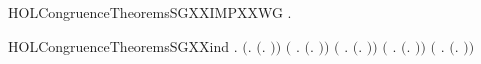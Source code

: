 \newcommand{\HOLCongruenceTheoremsSGXXIMPXXCONTEXT}{\UseVerbatim{HOLCongruenceTheoremsSGXXIMPXXCONTEXT}}
\begin{SaveVerbatim}{HOLCongruenceTheoremsSGXXIMPXXWG}
\HOLTokenTurnstile{} \HOLSymConst{\HOLTokenForall{}}.   \HOLSymConst{\HOLTokenImp{}}  
\end{SaveVerbatim}
\newcommand{\HOLCongruenceTheoremsSGXXIMPXXWG}{\UseVerbatim{HOLCongruenceTheoremsSGXXIMPXXWG}}
\begin{SaveVerbatim}{HOLCongruenceTheoremsSGXXind}
\HOLTokenTurnstile{} \HOLSymConst{\HOLTokenForall{}}.
       \ensuremath{(}\HOLSymConst{\HOLTokenForall{}}.  \ensuremath{(}\HOLTokenLambda{}. \ensuremath{)}\ensuremath{)} \HOLSymConst{\HOLTokenConj{}}
       \ensuremath{(}\HOLSymConst{\HOLTokenForall{}} .   \HOLSymConst{\HOLTokenImp{}}  \ensuremath{(}\HOLTokenLambda{}.  \HOLSymConst{\ensuremath{\ldotp}} \ensuremath{)}\ensuremath{)} \HOLSymConst{\HOLTokenConj{}}
       \ensuremath{(}\HOLSymConst{\HOLTokenForall{}} .   \HOLSymConst{\HOLTokenImp{}}  \ensuremath{(}\HOLTokenLambda{}. \HOLSymConst{\ensuremath{\ldotp}} \ensuremath{)}\ensuremath{)} \HOLSymConst{\HOLTokenConj{}}
       \ensuremath{(}\HOLSymConst{\HOLTokenForall{}} .   \HOLSymConst{\HOLTokenConj{}}   \HOLSymConst{\HOLTokenImp{}}  \ensuremath{(}\HOLTokenLambda{}.   \HOLSymConst{\ensuremath{+}}  \ensuremath{)}\ensuremath{)} \HOLSymConst{\HOLTokenConj{}}
       \ensuremath{(}\HOLSymConst{\HOLTokenForall{}} .   \HOLSymConst{\HOLTokenConj{}}   \HOLSymConst{\HOLTokenImp{}}  \ensuremath{(}\HOLTokenLambda{}.   \HOLSymConst{\ensuremath{\mid}}  \ensuremath{)}\ensuremath{)} \HOLSymConst{\HOLTokenConj{}}

\end{SaveVerbatim}
